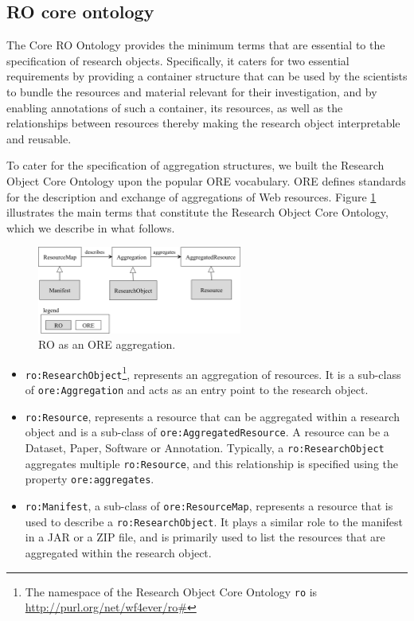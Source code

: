 \subsection{RO core ontology} 
The Core RO Ontology provides the minimum terms that are essential to the specification of research objects. Specifically, it caters for two essential requirements by providing a container structure that can be used by the scientists to bundle the resources and material relevant for their investigation, and by enabling annotations of such a container, its resources, as well as the relationships between resources thereby making the research object interpretable and reusable. 

To cater for the specification of aggregation structures, we built the Research Object Core Ontology upon the popular ORE vocabulary. ORE defines standards for the description and exchange of aggregations of Web resources. 
Figure \ref{fig:ro_ontology} illustrates the main terms that constitute the Research Object Core Ontology, which we describe in what follows.


\begin{figure}[ht]
  \centering
  \includegraphics[width=0.6\textwidth]{Figures/ro_ontology_1.png}
  \caption{RO as an ORE aggregation.}
  \label{fig:ro_ontology}
\end{figure}

\begin{itemize}
\item
\texttt{ro:ResearchObject}\footnote{The namespace of the Research Object Core Ontology \texttt{ro} is \url{http://purl.org/net/wf4ever/ro\#}}, represents an aggregation of resources. It is a sub-class of \texttt{ore:Aggregation} and acts as an entry point to the research object.
\item
\texttt{ro:Resource}, represents a resource that can be aggregated within a research object and is a sub-class of \texttt{ore:AggregatedResource}. A resource can be a Dataset, Paper, Software or Annotation. Typically, a \texttt{ro:ResearchObject} aggregates multiple \texttt{ro:Resource}, and this relationship is specified using the property \texttt{ore:aggregates}.
\item
\texttt{ro:Manifest}, a sub-class of \texttt{ore:ResourceMap}, represents a resource that is used to describe a \texttt{ro:ResearchObject}. It plays a similar role to the manifest in a JAR or a ZIP file, and is primarily used to list the resources that are aggregated within the research object.
\end{itemize}

